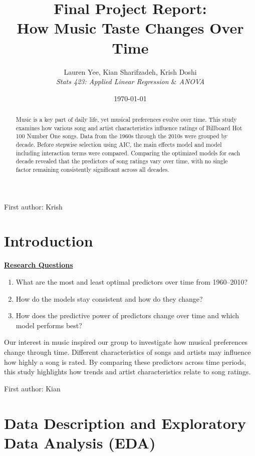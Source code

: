 \documentclass[11pt]{article}
\title{\textbf{Final Project Report:\\How Music Taste Changes Over Time}}
\author{
    Lauren Yee, 
    Kian Sharifzadeh, 
    Krish Doshi \\
    \vspace{0.3cm}
    \textit{Stats 423: Applied Linear Regression $\&$ ANOVA}
}
\date{\today}
\begin{document}
\maketitle

\begin{abstract}
Music is a key part of daily life, yet musical preferences evolve over time. 
This study examines how various song and artist characteristics influence ratings of Billboard Hot 100 Number One songs. 
Data from the 1960s through the 2010s were grouped by decade. Before stepwise selection using AIC, the main effects model and model including interaction terms were compared.
Comparing the optimized models for each decade revealed that the predictors of song ratings vary over time, with no single factor remaining consistently significant across all decades.
\end{abstract}

\onehalfspacing
 
{\scriptsize First author: Krish}
\section{Introduction}

\textbf{\underline{Research Questions}}

\begin{enumerate}
\item What are the most and least optimal predictors over time from 1960--2010?
\item How do the models stay consistent and how do they change?
\item How does the predictive power of predictors change over time and which model performs best?
\end{enumerate}

Our interest in music inspired our group to investigate how musical preferences change through time. 
Different characteristics of songs and artists may influence how highly a song is rated.
By comparing these predictors across time periods, this study highlights how trends and artist characteristics relate to song ratings.

{\scriptsize First author: Kian}
\section{Data Description and Exploratory Data Analysis (EDA)}
\end{document}
